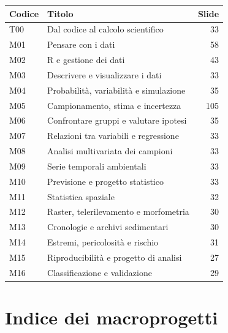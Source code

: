 \documentclass[11pt,a4paper]{article}
\begin{document}
\begin{longtable}{p{1.2cm}p{12cm}r}\toprule Codice & Titolo & Slide\\\midrule\endhead

T00 & Dal codice al calcolo scientifico & 33\\

M01 & Pensare con i dati & 58\\

M02 & R e gestione dei dati & 43\\

M03 & Descrivere e visualizzare i dati & 33\\

M04 & Probabilità, variabilità e simulazione & 35\\

M05 & Campionamento, stima e incertezza & 105\\

M06 & Confrontare gruppi e valutare ipotesi & 35\\

M07 & Relazioni tra variabili e regressione & 33\\

M08 & Analisi multivariata dei campioni & 33\\

M09 & Serie temporali ambientali & 33\\

M10 & Previsione e progetto statistico & 33\\

M11 & Statistica spaziale & 32\\

M12 & Raster, telerilevamento e morfometria & 30\\

M13 & Cronologie e archivi sedimentari & 30\\

M14 & Estremi, pericolosità e rischio & 31\\

M15 & Riproducibilità e progetto di analisi & 27\\

M16 & Classificazione e validazione & 29\\

\bottomrule\end{longtable}\newpage\section*{Indice dei macroprogetti}
\end{document}

